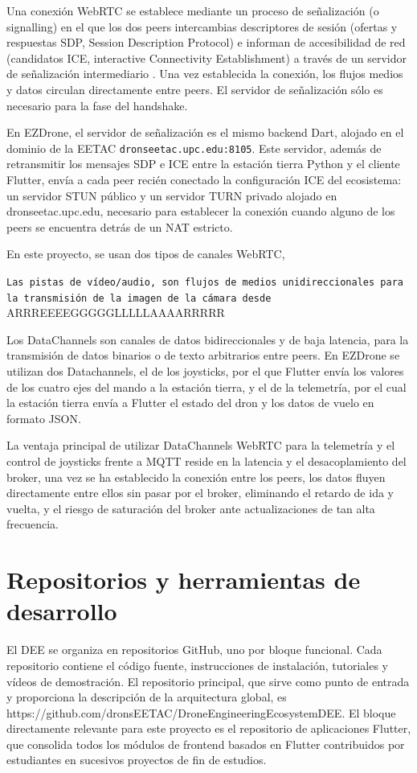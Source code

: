Una conexión WebRTC se establece mediante un proceso de señalización (o signalling)\cite{signalling} en el que los dos peers intercambias descriptores de sesión (ofertas y respuestas SDP, Session Description Protocol) e informan de accesibilidad de red (candidatos ICE, interactive Connectivity Establishment) a través de un servidor de señalización intermediario . Una vez establecida la conexión, los flujos medios y datos circulan directamente entre peers. El servidor de señalización sólo es necesario para la fase del handshake.

En EZDrone, el servidor de señalización es el mismo backend Dart, alojado en el dominio de la EETAC \texttt{dronseetac.upc.edu:8105}. Este servidor, además de retransmitir los mensajes SDP e ICE entre la estación tierra Python y el cliente Flutter, envía a cada peer recién conectado la configuración ICE del ecosistema: un servidor STUN público y un servidor TURN privado alojado en dronseetac.upc.edu, necesario para establecer la conexión cuando alguno de los peers se encuentra detrás de un NAT estricto.

En este proyecto, se usan dos tipos de canales WebRTC,

\texttt{Las pistas de vídeo/audio, son flujos de medios unidireccionales para la transmisión de la imagen de la cámara desde }ARRREEEEGGGGGLLLLLAAAARRRRR

Los DataChannels son canales de datos bidireccionales y de baja latencia, para la transmisión de datos binarios o de texto arbitrarios entre peers. En EZDrone se utilizan dos Datachannels, el de los joysticks, por el que Flutter envía los valores de los cuatro ejes del mando a la estación tierra, y el de la telemetría, por el cual la estación tierra envía a Flutter el estado del dron y los datos de vuelo en formato JSON\cite{json}.

La ventaja principal de utilizar DataChannels WebRTC para la telemetría y el control de joysticks frente a MQTT reside en la latencia y el desacoplamiento del broker, una vez se ha establecido la conexión entre los peers, los datos fluyen directamente entre ellos sin pasar por el broker, eliminando el retardo de ida y vuelta, y el riesgo de saturación del broker ante actualizaciones de tan alta frecuencia.

\section{Repositorios y herramientas de desarrollo}
El DEE se organiza en repositorios GitHub, uno por bloque funcional. Cada repositorio contiene el código fuente, instrucciones de instalación, tutoriales y vídeos de demostración. El repositorio principal, que sirve como punto de entrada y proporciona la descripción de la arquitectura global, es https://github.com/dronsEETAC/DroneEngineeringEcosystemDEE. 
El bloque directamente relevante para este proyecto es el repositorio de aplicaciones Flutter, que consolida todos los módulos de frontend basados en Flutter contribuidos por estudiantes en sucesivos proyectos de fin de estudios.

